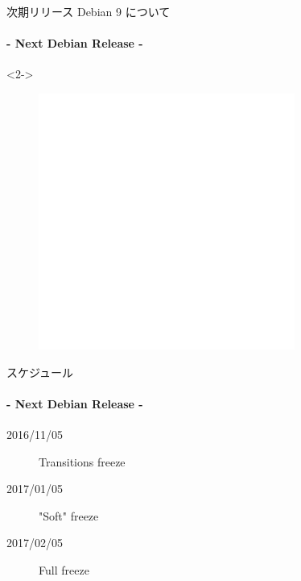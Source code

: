 \documentclass[cjk,dvipdfmx,14pt,compress,fragile]{beamer}
\begin{document}
\begin{frame}[c,fragile]{次期リリース Debian 9 について}
  \framesubtitle{- Next Debian Release -}
  \pause
  \begin{onlyenv}<2->
    \begin{figure}
      \centering
      \includegraphics[width=0.75\textwidth]{image201701/blank.png}
    \end{figure}
  \end{onlyenv}
\end{frame}

\begin{frame}[c,fragile]{スケジュール}
  \framesubtitle{- Next Debian Release -}
  \begin{description}
  \item[2016/11/05] %
    Transitions freeze
  \item[2017/01/05] %
    "Soft" freeze     \hspace{4em}
  \item[2017/02/05] %
    Full freeze
  \end{description}
\end{frame}
\end{document}
